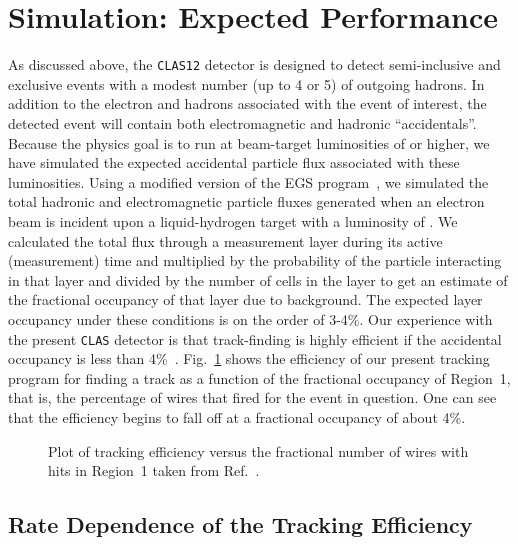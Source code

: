 \section{Simulation: Expected Performance}
\label{simulation}

As discussed above, the {\tt CLAS12} detector is designed to detect 
semi-inclusive and exclusive events with a modest number (up to 4 or 5) 
of outgoing hadrons.  In addition to the electron and hadrons associated 
with the event of interest, the detected event will contain both 
electromagnetic and hadronic ``accidentals''.  Because the physics goal is 
to run at beam-target luminosities of  or higher, we have simulated the 
expected accidental particle flux associated with these luminosities.  Using 
a modified version of the EGS program~\cite{egs}, we simulated the total 
hadronic and electromagnetic particle fluxes generated when an electron beam 
is incident upon a liquid-hydrogen target with a luminosity of .  We 
calculated the total flux through a measurement layer during its active 
(measurement) time and multiplied by the probability of the particle interacting 
in that layer and divided by the number of cells in the layer to get an estimate 
of the fractional occupancy of that layer due to background.  The expected layer 
occupancy under these conditions is on the order of 3-4\%.  Our experience with 
the present {\tt CLAS} detector is that track-finding is highly efficient if the 
accidental occupancy is less than 4\%~\cite{dcnim}.  Fig.~\ref{trkeff} shows 
the efficiency of our present tracking program for finding a track as a 
function of the fractional occupancy of Region~1, that is, the percentage of 
wires that fired for the event in question.  One can see that the efficiency
begins to fall off at a fractional occupancy of about 4\%.

\begin{figure}[htbp]
\vspace{8.0cm}
\caption{\small{Plot of tracking efficiency versus the fractional number
of wires with hits in Region~1 taken from Ref.~\cite{dcnim}.}}
\label{trkeff}
\end{figure}

\subsection{Rate Dependence of the Tracking Efficiency}

